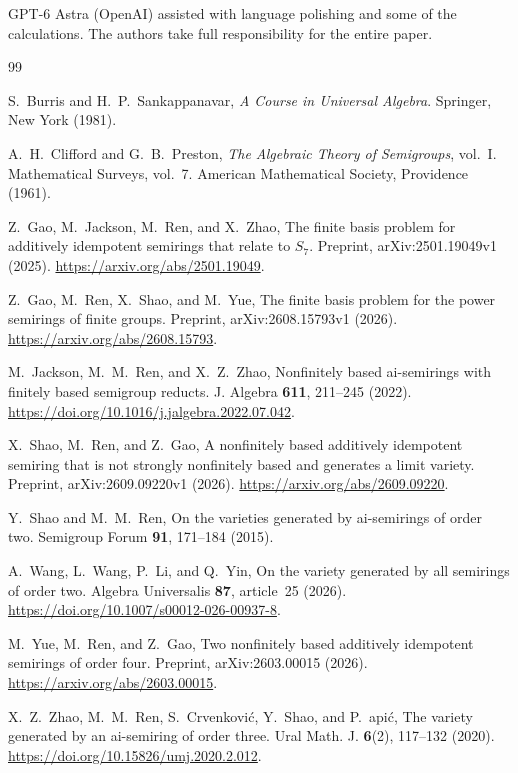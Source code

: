 \documentclass[11pt,reqno]{amsart}
\numberwithin{equation}{section}
\theoremstyle{definition}
\theoremstyle{remark}
\begin{document}
GPT-6 Astra (OpenAI) assisted with language polishing and some of the calculations. The authors take full responsibility for the entire paper.
\clearpage
\begin{thebibliography}{99}

S.~Burris and H.~P.~Sankappanavar,
\emph{A Course in Universal Algebra}.
Springer, New York (1981).

A.~H.~Clifford and G.~B.~Preston,
\emph{The Algebraic Theory of Semigroups}, vol.~I.
Mathematical Surveys, vol.~7.
American Mathematical Society, Providence (1961).

Z.~Gao, M.~Jackson, M.~Ren, and X.~Zhao,
The finite basis problem for additively idempotent semirings
that relate to $S_7$.
Preprint, arXiv:2501.19049v1 (2025).
\url{https://arxiv.org/abs/2501.19049}.

Z.~Gao, M.~Ren, X.~Shao, and M.~Yue,
The finite basis problem for the power semirings of finite groups.
Preprint, arXiv:2608.15793v1 (2026).
\url{https://arxiv.org/abs/2608.15793}.

M.~Jackson, M.~M.~Ren, and X.~Z.~Zhao,
Nonfinitely based ai-semirings with finitely based semigroup reducts.
J. Algebra \textbf{611}, 211--245 (2022).
\url{https://doi.org/10.1016/j.jalgebra.2022.07.042}.

X.~Shao, M.~Ren, and Z.~Gao,
A nonfinitely based additively idempotent semiring that is not
strongly nonfinitely based and generates a limit variety.
Preprint, arXiv:2609.09220v1 (2026).
\url{https://arxiv.org/abs/2609.09220}.

Y.~Shao and M.~M.~Ren,
On the varieties generated by ai-semirings of order two.
Semigroup Forum \textbf{91}, 171--184 (2015).

A.~Wang, L.~Wang, P.~Li, and Q.~Yin,
On the variety generated by all semirings of order two.
Algebra Universalis \textbf{87}, article~25 (2026).
\url{https://doi.org/10.1007/s00012-026-00937-8}.

M.~Yue, M.~Ren, and Z.~Gao,
Two nonfinitely based additively idempotent semirings of order four.
Preprint, arXiv:2603.00015 (2026).
\url{https://arxiv.org/abs/2603.00015}.

X.~Z.~Zhao, M.~M.~Ren, S.~Crvenkovi\'c, Y.~Shao, and P.~\DJ api\'c,
The variety generated by an ai-semiring of order three.
Ural Math. J. \textbf{6}(2), 117--132 (2020).
\url{https://doi.org/10.15826/umj.2020.2.012}.

\end{thebibliography}
\end{document}
